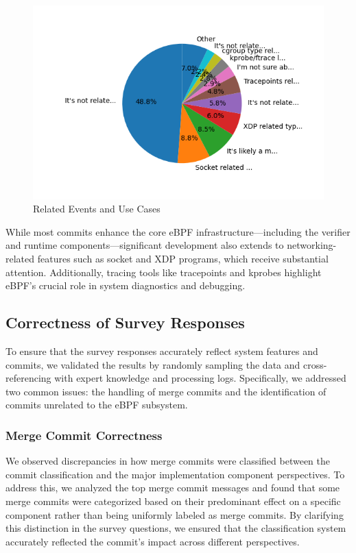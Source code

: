 \begin{figure}[ht]
    \centering
    \includegraphics[width=\linewidth]{feature-analysis/commit_pie_chart_usecases_or_submodule_events.png}
    \caption{Related Events and Use Cases}
    \label{fig:commit_pie_chart_usecases_or_submodule_events}
\end{figure}

While most commits enhance the core eBPF infrastructure—including the verifier and runtime components—significant development also extends to networking-related features such as socket and XDP programs, which receive substantial attention. Additionally, tracing tools like tracepoints and kprobes highlight eBPF's crucial role in system diagnostics and debugging.

\subsection{Correctness of Survey Responses}

To ensure that the survey responses accurately reflect system features and commits, we validated the results by randomly sampling the data and cross-referencing with expert knowledge and processing logs. Specifically, we addressed two common issues: the handling of merge commits and the identification of commits unrelated to the eBPF subsystem.

\subsubsection{Merge Commit Correctness}

We observed discrepancies in how merge commits were classified between the commit classification and the major implementation component perspectives. To address this, we analyzed the top merge commit messages and found that some merge commits were categorized based on their predominant effect on a specific component rather than being uniformly labeled as merge commits. By clarifying this distinction in the survey questions, we ensured that the classification system accurately reflected the commit's impact across different perspectives.

